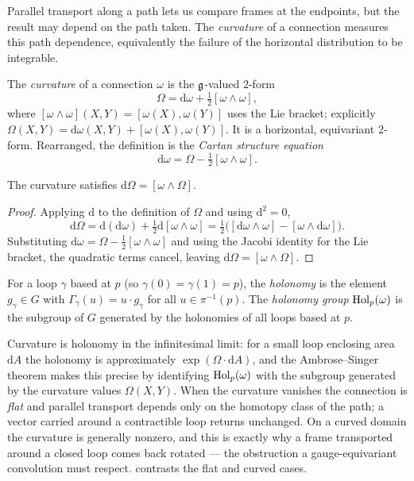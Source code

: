 Parallel transport along a path lets us compare frames at the endpoints, but the
result may depend on the path taken. The \emph{curvature} of a connection
measures this path dependence, equivalently the failure of the horizontal
distribution to be integrable.

\begin{definition}
\label{def:gauge:curvature}
The \emph{curvature} of a connection $\omega$ is the $\mathfrak{g}$-valued $2$-form
\[
  \Omega = \mathrm{d}\omega + \tfrac{1}{2}[\omega \wedge \omega],
\]
where $[\omega \wedge \omega](X, Y) = [\omega(X), \omega(Y)]$ uses the Lie
bracket; explicitly $\Omega(X, Y) = \mathrm{d}\omega(X, Y) + [\omega(X),
\omega(Y)]$. It is a horizontal, equivariant $2$-form. Rearranged, the definition
is the \emph{Cartan structure equation}
\[
  \mathrm{d}\omega = \Omega - \tfrac{1}{2}[\omega \wedge \omega].
\]
\end{definition}

\begin{theorem}
\label{thm:gauge:bianchi}
The curvature satisfies $\mathrm{d}\Omega = [\omega \wedge \Omega]$.
\end{theorem}

\begin{proof}
Applying $\mathrm{d}$ to the definition of $\Omega$ and using $\mathrm{d}^2 = 0$,
\[
  \mathrm{d}\Omega = \mathrm{d}(\mathrm{d}\omega) + \tfrac{1}{2}\mathrm{d}[\omega
  \wedge \omega] = \tfrac{1}{2}\big([\mathrm{d}\omega \wedge \omega] - [\omega
  \wedge \mathrm{d}\omega]\big).
\]
Substituting $\mathrm{d}\omega = \Omega - \tfrac{1}{2}[\omega \wedge \omega]$ and
using the Jacobi identity for the Lie bracket, the quadratic terms cancel,
leaving $\mathrm{d}\Omega = [\omega \wedge \Omega]$.
\end{proof}

\begin{definition}[Holonomy]
\label{def:gauge:holonomy}
For a loop $\gamma$ based at $p$ (so $\gamma(0) = \gamma(1) = p$), the
\emph{holonomy} is the element $g_\gamma \in G$ with $\Gamma_\gamma(u) = u \cdot
g_\gamma$ for all $u \in \pi^{-1}(p)$. The \emph{holonomy group}
$\operatorname{Hol}_p(\omega)$ is the subgroup of $G$ generated by the holonomies of all loops
based at $p$.
\end{definition}

Curvature is holonomy in the infinitesimal limit: for a small loop enclosing
area $\mathrm{d}A$ the holonomy is approximately $\exp(\Omega \cdot \mathrm{d}A)$,
and the Ambrose--Singer theorem makes this precise by identifying $\operatorname{Hol}_p(\omega)$
with the subgroup generated by the curvature values $\Omega(X, Y)$. When the
curvature vanishes the connection is \emph{flat} and parallel transport depends
only on the homotopy class of the path; a vector carried around a contractible
loop returns unchanged. On a curved domain the curvature is generally nonzero,
and this is exactly why a frame transported around a closed loop comes back
rotated --- the obstruction a gauge-equivariant convolution must respect.
 contrasts the flat and curved cases.

